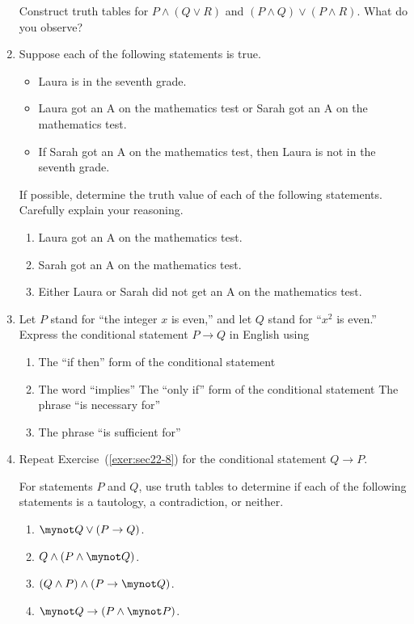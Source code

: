 \begin{enumerate}
\xitem \label{exer:sec22-6}%
Construct truth tables for  $P \wedge \left( {Q \vee R} \right)$  and  $\left( {P \wedge Q} \right) \vee \left( {P \wedge R} \right)$.  What do you observe? 
%
\item \label{exer:sec22-7}%
Suppose each of the following statements is true.  
  \begin{itemize}
    \item Laura is in the seventh grade.
    \item Laura got an A on the mathematics test or Sarah got an A on the mathematics test.
    \item If Sarah got an A on the mathematics test, then Laura is not in the seventh grade.
  \end{itemize}
If possible, determine the truth value of each of the following statements.  Carefully explain your reasoning.
  \begin{enumerate}
    \item Laura got an A on the mathematics test.
    \item Sarah got an A on the mathematics test.
    \item Either Laura or Sarah did not get an A on the mathematics test.
  \end{enumerate}
%
\item Let  $P$  stand for  ``the integer  $x$  is even,'' and let  $Q$  stand for ``$x^2$  is even.''  Express the conditional statement  $P \to Q$ in English using
  \begin{enumerate}
    \item The ``if then'' form of the conditional statement
    \item The word ``implies''
    \yitem The ``only if'' form of the conditional statement
    \yitem The phrase ``is necessary for''
    \item The phrase ``is sufficient for''
  \end{enumerate}  \label{exer:sec22-8}%
%
\item \label{exer:sec22-9}%
Repeat Exercise~(\ref{exer:sec22-8}) for the conditional statement  $Q \to P$. 



\xitem For statements $P$ and $Q$, use truth tables to determine if each of the following statements is a tautology, a contradiction, or neither. \label{exer:tautology-contra}
\begin{multicols}{2}
\begin{enumerate}
  \item $\mynot Q \vee (P \to Q)$.
  \item $Q \wedge (P \wedge \mynot Q)$.
  \item $(Q \wedge P) \wedge (P \to \mynot Q)$.
  \item $\mynot Q \to (P \wedge \mynot P)$.
\end{enumerate}
\end{multicols}




\end{enumerate}
